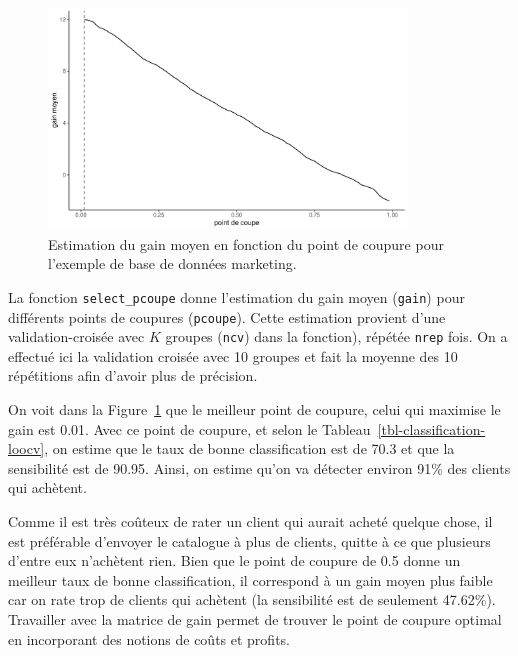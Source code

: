 \documentclass[
  11pt,
  letterpaper,
]{scrbook}
\theoremstyle{definition}
\theoremstyle{remark}
\begin{document}
\begin{figure}[ht!]

{\centering \includegraphics[width=0.85\textwidth,height=\textheight]{./05-reglogistique_files/figure-pdf/fig-coupure-pondere-1.pdf}

}

\caption{\label{fig-coupure-pondere}Estimation du gain moyen en fonction
du point de coupure pour l'exemple de base de données marketing.}

\end{figure}

La fonction \texttt{select\_pcoupe} donne l'estimation du gain moyen
(\texttt{gain}) pour différents points de coupures (\texttt{pcoupe}).
Cette estimation provient d'une validation-croisée avec \(K\) groupes
(\texttt{ncv}) dans la fonction), répétée \texttt{nrep} fois. On a
effectué ici la validation croisée avec 10 groupes et fait la moyenne
des 10 répétitions afin d'avoir plus de précision.

On voit dans la Figure~\ref{fig-coupure-pondere} que le meilleur point
de coupure, celui qui maximise le gain est 0.01. Avec ce point de
coupure, et selon le Tableau~\ref{tbl-classification-loocv}, on estime
que le taux de bonne classification est de 70.3 et que la sensibilité
est de 90.95. Ainsi, on estime qu'on va détecter environ 91\% des
clients qui achètent.

Comme il est très coûteux de rater un client qui aurait acheté quelque
chose, il est préférable d'envoyer le catalogue à plus de clients,
quitte à ce que plusieurs d'entre eux n'achètent rien. Bien que le point
de coupure de 0.5 donne un meilleur taux de bonne classification, il
correspond à un gain moyen plus faible car on rate trop de clients qui
achètent (la sensibilité est de seulement 47.62\%). Travailler avec la
matrice de gain permet de trouver le point de coupure optimal en
incorporant des notions de coûts et profits.
\end{document}
